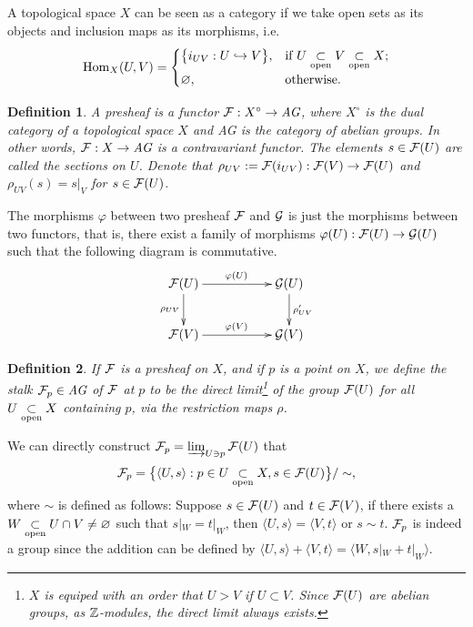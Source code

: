 \documentclass[9pt]{extarticle}
\theoremstyle{plain}
\newtheorem{defi}{Definition}
\begin{document}
A topological space $X$ can be seen as a category if we take open sets as its objects and inclusion maps as its morphisms, i.e. 
\[
	\operatorname{Hom}_{X}(U,V)=\begin{cases}
	\bigl\{i_{UV}:U\hookrightarrow V\bigr\},& \text{if }U\underset{\mathrm{open}}{\subset} V\underset{\mathrm{open}}{\subset} X\text{;}\\
	\varnothing,&\text{otherwise}.
	\end{cases}
\]

\begin{defi}
	A presheaf is a functor $\mathcal{F}:X^\circ\to \textit{AG}$, where $X^\circ$ is the dual category of a topological space $X$ and \textit{AG} is the category of abelian groups. In other words, $\mathcal{F}:X\to \textit{AG}$ is a contravariant functor. The elements $s\in \mathcal{F}(U)$ are called the sections on $U$. Denote that $\rho_{UV}:=\mathcal{F}(i_{UV}):\mathcal{F}(V)\to\mathcal{F}(U)$ and $\rho_{UV}(s)=s|_V$ for $s \in \mathcal{F}(U)$.
\end{defi}

The morphisms $\varphi$ between two presheaf $\mathcal{F}$ and $\mathcal{G}$ is just the morphisms between two functors, that is, there exist a family of morphisms $\varphi(U):\mathcal{F}(U)\to \mathcal{G}(U)$ such that the following diagram is commutative.
\[
	\begin{xy}
	\xymatrix{
		\calf(U)\ar[rr]^{\varphi(U)} \ar[d]_{\rho_{UV}}&&\calg(U) \ar[d]^{\rho'_{UV}}\\
		\calf(V)\ar[rr]^{\varphi(V)}&&\calg(V)
	}
	\end{xy}
\]
\begin{defi}
	If $\mathcal{F}$ is a presheaf on $X$, and if $p$ is a point on $X$, we define the stalk $\mathcal{F}_p\in \textit{AG}$ of $\mathcal{F}$ at $p$ to be the direct limit\footnote{$X$ is equiped with an order that $U>V$ if $U\subset V$. Since $\mathcal{F}(U)$ are abelian groups, as $\mathbb{Z}$-modules, the direct limit always exists.} of the group $\mathcal{F}(U)$ for all $U \underset{\mathrm{open}}{\subset} X$ containing $p$, via the restriction maps $\rho$.
\end{defi}

We can directly construct $\mathcal{F}_p=\varinjlim_{U\ni p}\mathcal{F}(U)$ that 
\[
	\mathcal{F}_p=\bigl\{\langle U,s\rangle: p\in U\underset{\mathrm{open}}{\subset} X, s\in \mathcal{F}(U)\bigr\}/\sim,
\]
where $\sim$ is defined as follows: Suppose $s\in\mathcal{F}(U)$ and $t\in\mathcal{F}(V)$, if there exists a $W\underset{\mathrm{open}}{\subset} U\cap V\neq \varnothing$ such that $s|_W=t|_W$, then $\langle U,s\rangle=\langle V,t\rangle$ or $s\sim t$. $\mathcal{F}_p$ is indeed a group since the addition can be defined by $\langle U,s\rangle+\langle V,t\rangle=\langle W,s|_W+t|_W\rangle$. 
\end{document}
